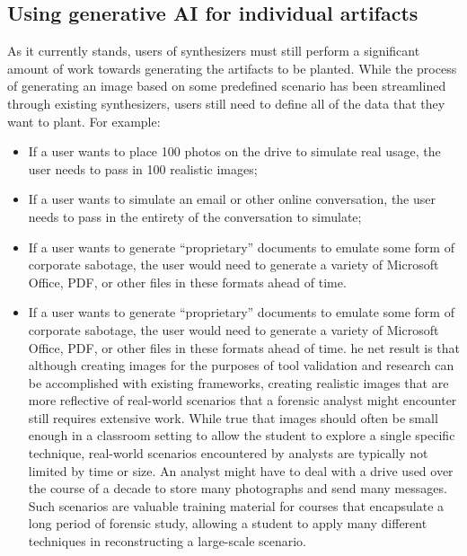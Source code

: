 \subsection{Using generative AI for individual
artifacts}\label{using-generative-ai-for-individual-artifacts}

As it currently stands, users of synthesizers must still perform a
significant amount of work towards generating the artifacts to be
planted. While the process of generating an image based on some
predefined scenario has been streamlined through existing synthesizers,
users still need to define all of the data that they want to plant. For
example:

\begin{itemize}
\item
  If a user wants to place 100 photos on the drive to simulate real
  usage, the user needs to pass in 100 realistic images;
\item
  If a user wants to simulate an email or other online conversation, the
  user needs to pass in the entirety of the conversation to simulate;
\item
  If a user wants to generate ``proprietary'' documents to emulate some
  form of corporate sabotage, the user would need to generate a variety
  of Microsoft Office, PDF, or other files in these formats ahead of
  time.
\item
  If a user wants to generate ``proprietary'' documents to emulate some
  form of corporate sabotage, the user would need to generate a variety
  of Microsoft Office, PDF, or other files in these formats ahead of
  time. he net result is that although creating images for the purposes
  of tool validation and research can be accomplished with existing
  frameworks, creating realistic images that are more reflective of
  real-world scenarios that a forensic analyst might encounter still
  requires extensive work. While true that images should often be small
  enough in a classroom setting to allow the student to explore a single
  specific technique, real-world scenarios encountered by analysts are
  typically not limited by time or size. An analyst might have to deal
  with a drive used over the course of a decade to store many
  photographs and send many messages. Such scenarios are valuable
  training material for courses that encapsulate a long period of
  forensic study, allowing a student to apply many different techniques
  in reconstructing a large-scale scenario.
\end{itemize}

